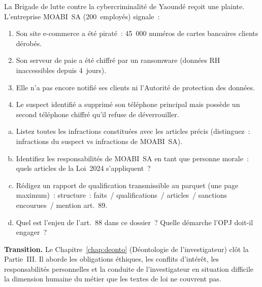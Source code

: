 \begin{boxexo}[title={\ding{45}\quad Exercice~12.3. Simulation MOABI \niveauexpert}]
La Brigade de lutte contre la cybercriminalité de Yaoundé reçoit une plainte.
L'entreprise MOABI~SA (200~employés) signale~:
\begin{enumerate}
    \item Son site e-commerce a été piraté~: 45~000 numéros de cartes
          bancaires clients dérobés.
    \item Son serveur de paie a été chiffré par un ransomware
          (données RH inaccessibles depuis 4~jours).
    \item Elle n'a pas encore notifié ses clients ni l'Autorité de
          protection des données.
    \item Le suspect identifié a supprimé son téléphone principal
          mais possède un second téléphone chiffré qu'il refuse de
          déverrouiller.
\end{enumerate}
\begin{enumerate}[(a)]
    \item Listez toutes les infractions constituées avec les articles
          précis (distinguez~: infractions du suspect vs infractions de
          MOABI~SA).
    \item Identifiez les responsabilités de MOABI~SA en tant que personne
          morale~: quels articles de la Loi~2024 s'appliquent~?
    \item Rédigez un rapport de qualification transmissible au parquet
          (une page maximum)~: structure~: faits~/ qualifications~/ articles~/ sanctions encourues~/ mention art.~89.
    \item Quel est l'enjeu de l'art.~88 dans ce dossier~? Quelle démarche
          l'OPJ doit-il engager~?
\end{enumerate}
\end{boxexo}

\bigskip

\begin{boxinfo}
\textbf{Transition.} Le Chapitre~\ref{chap:deonto} (Déontologie de
l'investigateur) clôt la Partie~III. Il aborde les obligations éthiques,
les conflits d'intérêt, les responsabilités personnelles et la conduite
de l'investigateur en situation difficile la dimension humaine du
métier que les textes de loi ne couvrent pas.
\end{boxinfo}
